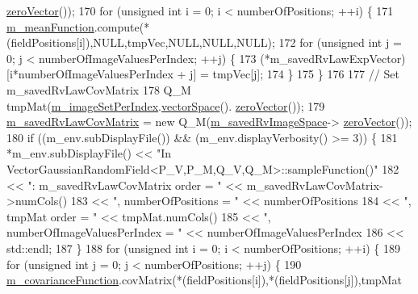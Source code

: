 \begin{DoxyCode}
      \hyperlink{class_q_u_e_s_o_1_1_vector_space_a92e963bb5cab3eecd290dfe4b8f03b04}{zeroVector}());
170     \textcolor{keywordflow}{for} (\textcolor{keywordtype}{unsigned} \textcolor{keywordtype}{int} i = 0; i < numberOfPositions; ++i) \{
171       \hyperlink{class_q_u_e_s_o_1_1_vector_gaussian_random_field_a648031ddf7e3d5d4d0eb353edc52b4bc}{m\_meanFunction}.compute(*(fieldPositions[i]),NULL,tmpVec,NULL,NULL,NULL);
172       \textcolor{keywordflow}{for} (\textcolor{keywordtype}{unsigned} \textcolor{keywordtype}{int} j = 0; j < numberOfImageValuesPerIndex; ++j) \{
173         (*m\_savedRvLawExpVector)[i*numberOfImageValuesPerIndex + j] = tmpVec[j];
174       \}
175     \}
176 
177     \textcolor{comment}{// Set m\_savedRvLawCovMatrix}
178     Q\_M tmpMat(\hyperlink{class_q_u_e_s_o_1_1_vector_gaussian_random_field_a6e1a9a6a3512559e1579e3c8a266141f}{m\_imageSetPerIndex}.\hyperlink{class_q_u_e_s_o_1_1_vector_set_a923421590baf5bf93cf066e528f927dc}{vectorSpace}().
      \hyperlink{class_q_u_e_s_o_1_1_vector_space_a92e963bb5cab3eecd290dfe4b8f03b04}{zeroVector}());
179     \hyperlink{class_q_u_e_s_o_1_1_vector_gaussian_random_field_a0a07c1eec3d56ef764b13586a36921d3}{m\_savedRvLawCovMatrix} = \textcolor{keyword}{new} Q\_M(\hyperlink{class_q_u_e_s_o_1_1_vector_gaussian_random_field_a8fba910fff533442361ad7bd93e5706b}{m\_savedRvImageSpace}->
      \hyperlink{class_q_u_e_s_o_1_1_vector_space_a92e963bb5cab3eecd290dfe4b8f03b04}{zeroVector}());
180     \textcolor{keywordflow}{if} ((m\_env.subDisplayFile()) && (m\_env.displayVerbosity() >= 3)) \{
181       *m\_env.subDisplayFile() << \textcolor{stringliteral}{"In VectorGaussianRandomField<P\_V,P\_M,Q\_V,Q\_M>::sampleFunction()"}
182                               << \textcolor{stringliteral}{": m\_savedRvLawCovMatrix order = "} << m\_savedRvLawCovMatrix->numCols()
183                               << \textcolor{stringliteral}{", numberOfPositions = "}           << numberOfPositions
184                               << \textcolor{stringliteral}{", tmpMat order = "}                << tmpMat.numCols()
185                               << \textcolor{stringliteral}{", numberOfImageValuesPerIndex = "} << numberOfImageValuesPerIndex
186                               << std::endl;
187     \}
188     \textcolor{keywordflow}{for} (\textcolor{keywordtype}{unsigned} \textcolor{keywordtype}{int} i = 0; i < numberOfPositions; ++i) \{
189       \textcolor{keywordflow}{for} (\textcolor{keywordtype}{unsigned} \textcolor{keywordtype}{int} j = 0; j < numberOfPositions; ++j) \{
190         \hyperlink{class_q_u_e_s_o_1_1_vector_gaussian_random_field_a67b1325646a7076207d768cfd796eb95}{m\_covarianceFunction}.covMatrix(*(fieldPositions[i]),*(fieldPositions[j]),tmpMat

\end{DoxyCode}
